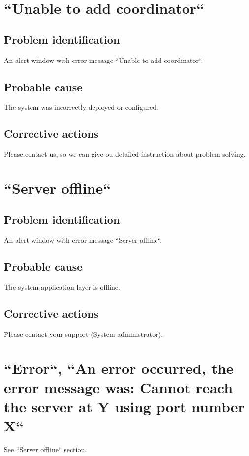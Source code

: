 \section{``Unable to add coordinator``}

\subsection{Problem identification}
An alert window with error message ``Unable to add coordinator``.

\subsection{Probable cause}
The system was incorrectly deployed or configured.

\subsection{Corrective actions}
Please contact us, so we can give ou detailed instruction about problem solving.

\section{``Server offline``}

\subsection{Problem identification}
An alert window with error message ``Server offline``.

\subsection{Probable cause}
The system application layer is offline.

\subsection{Corrective actions}
Please contact your support (System administrator).

\section{``Error``, ``An error occurred, the error message was: Cannot reach
the server at Y using port number X``}

See ``Server offline`` section.

